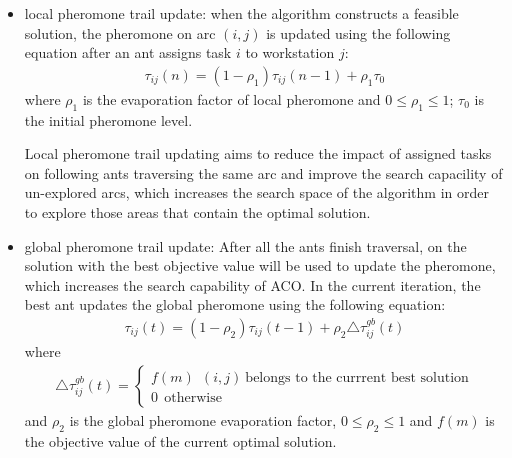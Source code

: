 \begin{itemize}
	\item local pheromone trail update: when the algorithm constructs a feasible solution, the pheromone on arc $(i,j)$ is updated using the following equation after an ant assigns task $i$ to workstation $j$:
	\begin{align}
		\tau_{ij}(n) = (1- \rho_1)\tau_{ij} (n-1) + \rho_1 \tau_0 \label{formula9}
	\end{align}
	where $\rho_1$ is the evaporation factor of local pheromone and $0 \leq \rho_1 \leq 1$; $\tau_0$ is the initial pheromone level.
	
	Local pheromone trail updating aims to reduce the impact of assigned tasks on following ants traversing the same arc and improve the search capacility of un-explored arcs, which increases the search space of the algorithm in order to explore those areas that contain the optimal solution. 
	\item global pheromone trail update: After all the ants finish traversal, on the solution with the best objective value will be used to update the pheromone, which increases the search capability of ACO. In the current iteration, the best ant updates the global pheromone using the following equation:
	\begin{align}
		\tau_{ij}(t) = (1 - \rho_2) \tau_{ij} (t - 1) + \rho_2 \triangle \tau_{ij}^{gb} (t) \label{formula10}
	\end{align}
	where 
	\begin{align}
		\triangle \tau_{ij}^{gb} (t) = \begin{cases}
		f(m) \ \ (i, j) \  \text{belongs to the currrent best solution} \\
		0 \ \ \text{otherwise}
		\end{cases}
	\end{align}
	and $\rho_2$ is the global pheromone evaporation factor, $0 \leq \rho_2 \leq 1$ and $f(m)$ is the objective value of the current optimal solution.
\end{itemize}

